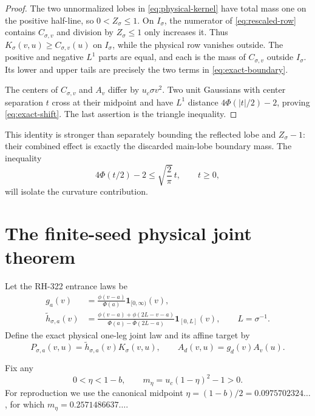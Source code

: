 \documentclass[11pt]{article}
\theoremstyle{remark}
\begin{document}
\begin{proof}
The two unnormalized lobes in \eqref{eq:physical-kernel} have total mass one
on the positive half-line, so $0<Z_\sigma\le1$.  On $I_\sigma$, the numerator
of \eqref{eq:rescaled-row} contains $C_{\sigma,v}$ and division by
$Z_\sigma\le1$ only increases it.  Thus
$K_\sigma(v,u)\ge C_{\sigma,v}(u)$ on $I_\sigma$, while the physical row
vanishes outside.  The positive and negative $L^1$ parts are equal, and each
is the mass of $C_{\sigma,v}$ outside $I_\sigma$.  Its lower and upper tails
are precisely the two terms in \eqref{eq:exact-boundary}.

The centers of $C_{\sigma,v}$ and $A_v$ differ by $u_c\sigma v^2$.
Two unit Gaussians with center separation $t$ cross at their midpoint and
have $L^1$ distance $4\Phi(|t|/2)-2$, proving
\eqref{eq:exact-shift}.  The last assertion is the triangle inequality.
\end{proof}

This identity is stronger than separately bounding the reflected lobe and
$Z_\sigma-1$: their combined effect is exactly the discarded main-lobe
boundary mass.  The inequality
\begin{equation}\label{eq:linear-shift-bound}
 4\Phi(t/2)-2\le\sqrt{\frac2\pi}\,t,
 \qquad t\ge0,
\end{equation}
will isolate the curvature contribution.

\section{The finite-seed physical joint theorem}

Let the RH-322 entrance laws be
\begin{align}
 g_a(v)&=\frac{\phi(v-a)}{\Phi(a)}\mathbf1_{[0,\infty)}(v),
 \label{eq:limit-seed}\\
 \widetilde h_{\sigma,a}(v)
 &=\frac{\phi(v-a)+\phi(2L-v-a)}
 {\Phi(a)-\overline\Phi(2L-a)}\mathbf1_{[0,L]}(v),
 \qquad L=\sigma^{-1}.
 \label{eq:finite-seed}
\end{align}
Define the exact physical one-leg joint law and its affine target by
\begin{equation}\label{eq:joint-laws}
 P_{\sigma,a}(v,u)=\widetilde h_{\sigma,a}(v)K_\sigma(v,u),
 \qquad
 A_d(v,u)=g_d(v)A_v(u).
\end{equation}

Fix any
\begin{equation}\label{eq:eta-margin}
 0<\eta<1-b,
 \qquad
 m_\eta=u_c(1-\eta)^2-1>0.
\end{equation}
For reproduction we use the canonical midpoint
$\eta=(1-b)/2=0.0975702324\ldots$, for which
$m_\eta=0.2571486637\ldots$.
\end{document}
